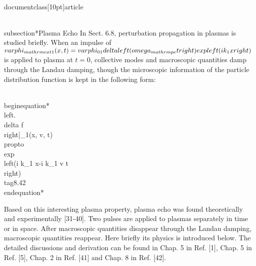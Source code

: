 \\documentclass[10pt]{article}
\begin{document}
{{{{{\\subsection*{Plasma Echo}
In Sect. 6.8, perturbation propagation in plasmas is studied briefly. When an impulse of $\\varphi_{\\mathrm{ext1}}(x, t)=\\varphi_{01} \\delta\\left(\\omega_{\\mathrm{pe}} t\\right) \\exp \\left(i k_{1} x\\right)$ is applied to plasma at $t=0$, collective modes and macroscopic quantities damp through the Landau damping, though the microscopic information of the particle distribution function is kept in the following form:


\\begin{equation*}
\\left.\\delta f\\right|_{1}(x, v, t) \\propto \\exp \\left(i k_{1} x-i k_{1} v t\\right) \\tag{8.42}
\\end{equation*}


Based on this interesting plasma property, plasma echo was found theoretically and experimentally [31-40]. Two pulses are applied to plasmas separately in time or in space. After macroscopic quantities disappear through the Landau damping, macroscopic quantities reappear. Here briefly its physics is introduced below. The detailed discussions and derivation can be found in Chap. 5 in Ref. [1], Chap. 5 in Ref. [5], Chap. 2 in Ref. [41] and Chap. 8 in Ref. [42].

}}}}}
\end{document}
